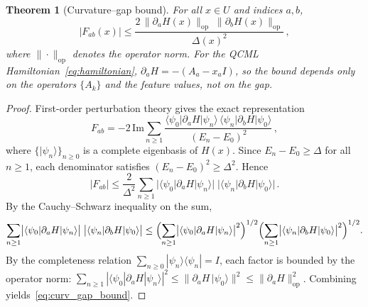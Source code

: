 \documentclass[3p]{elsarticle}
\newtheorem{theorem}{Theorem}
\newcommand{\ket}[1]{|#1\rangle}
\newcommand{\bra}[1]{\langle#1|}
\newcommand{\dbraket}[3]{\langle#1|#2|#3\rangle}
\begin{document}
\begin{theorem}[Curvature--gap bound]\label{thm:curvature_gap}
For all $x \in U$ and indices $a, b$,
\begin{equation}\label{eq:curv_gap_bound}
  |F_{ab}(x)| \leq
  \frac{2\,\|\partial_a H(x)\|_{\mathrm{op}}\;\|\partial_b H(x)\|_{\mathrm{op}}}
       {\Delta(x)^2}\,,
\end{equation}
where $\|\cdot\|_{\mathrm{op}}$ denotes the operator norm.
For the QCML Hamiltonian~\eqref{eq:hamiltonian},
$\partial_a H = -(A_a - x_a I)$, so the bound depends only on
the operators $\{A_k\}$ and the feature values, not on the gap.
\end{theorem}
\begin{proof}
First-order perturbation theory gives the exact representation
\begin{equation}\label{eq:berry_perturbation}
  F_{ab} = -2\,\mathrm{Im}\sum_{n \geq 1}
  \frac{\dbraket{\psi_0}{\partial_a H}{\psi_n}\,
        \dbraket{\psi_n}{\partial_b H}{\psi_0}}
       {(E_n - E_0)^2}\,,
\end{equation}
where $\{\ket{\psi_n}\}_{n \geq 0}$ is a complete eigenbasis of
$H(x)$.  Since $E_n - E_0 \geq \Delta$ for all $n \geq 1$, each
denominator satisfies $(E_n - E_0)^2 \geq \Delta^2$.  Hence
\[
  |F_{ab}|
  \leq \frac{2}{\Delta^2}\sum_{n \geq 1}
  \bigl|\dbraket{\psi_0}{\partial_a H}{\psi_n}\bigr|\;
  \bigl|\dbraket{\psi_n}{\partial_b H}{\psi_0}\bigr|\,.
\]
By the Cauchy--Schwarz inequality on the sum,
\[
  \sum_{n \geq 1}
  \bigl|\dbraket{\psi_0}{\partial_a H}{\psi_n}\bigr|\;
  \bigl|\dbraket{\psi_n}{\partial_b H}{\psi_0}\bigr|
  \leq
  \Bigl(\sum_{n \geq 1}
  \bigl|\dbraket{\psi_0}{\partial_a H}{\psi_n}\bigr|^2\Bigr)^{1/2}
  \Bigl(\sum_{n \geq 1}
  \bigl|\dbraket{\psi_n}{\partial_b H}{\psi_0}\bigr|^2\Bigr)^{1/2}.
\]
By the completeness relation
$\sum_{n \geq 0}\ket{\psi_n}\bra{\psi_n} = I$, each factor is
bounded by the operator norm:
$\sum_{n \geq 1}|\dbraket{\psi_0}{\partial_a H}{\psi_n}|^2
\leq \|\partial_a H\,\ket{\psi_0}\|^2
\leq \|\partial_a H\|_{\mathrm{op}}^2$.
Combining yields~\eqref{eq:curv_gap_bound}.
\end{proof}
\end{document}
